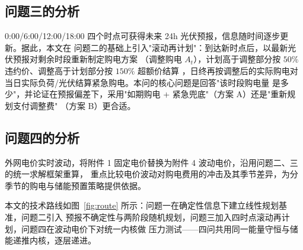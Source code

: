 \documentclass[withoutpreface]{cumcmthesis}
\begin{document}
\subsection{问题三的分析}
0:00/6:00/12:00/18:00 四个时点可获得未来 24h 光伏预报，信息随时间逐步更新。据此，本文在
问题二的基础上引入"滚动再计划"：到达新时点后，以最新光伏预报对剩余时段重新制定购电方案
（调整购电 $A_t$），计划高于调整部分按 $50\%$ 违约价、调整高于计划部分按 $150\%$ 超额价结算
，日终再按调整后的实际购电对当日实际负荷/光伏结算紧急购电。本问的核心问题是回答"该时段购电量
是多少"，并论证在预报偏差下，采用"如期购电 + 紧急兜底"（方案 A）还是"重新规划支付调整费"
（方案 B）更合适。

\subsection{问题四的分析}
外网电价实时波动，将附件 1 固定电价替换为附件 4 波动电价，沿用问题二、三的统一求解框架重算，
重点比较电价波动对购电费用的冲击及其季节差异，为分季节的购电与储能预置策略提供依据。

本文的技术路线如图~\ref{fig:route} 所示：问题一在确定性信息下建立线性规划基准，问题二引入
预报不确定性与两阶段随机规划，问题三加入四时点滚动再计划，问题四在波动电价下对统一内核做
压力测试——四问共用同一能量守恒与储能递推内核，逐层递进。
\end{document}
